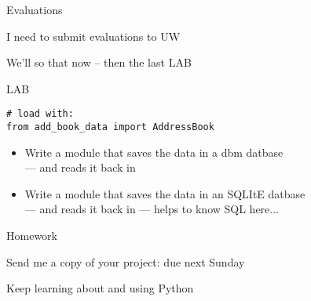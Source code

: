 \documentclass{beamer}
\begin{document}
\begin{frame}{Evaluations}

{\LARGE I need to submit evaluations to UW}

\vfill
{\LARGE We'll so that now -- then the last LAB}

\end{frame}


\begin{frame}[fragile]{LAB}

\begin{verbatim}
# load with:
from add_book_data import AddressBook
\end{verbatim}

\begin{itemize}
  \item Write a module that saves the data in a dbm datbase\\
        --- and reads it back in
  \item Write a module that saves the data in an SQLItE datbase\\
        --- and reads it back in
        --- helps to know SQL here...
\end{itemize}

\end{frame}

\begin{frame}{Homework}

\vfill
{\Large Send me a copy of your project: due next Sunday}

\vfill
{\Large Keep learning about and using Python}
\vfill

\end{frame}
\end{document}
